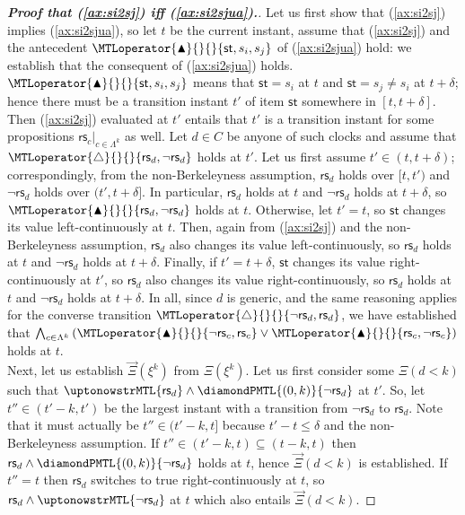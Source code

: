 \documentclass[a4paper]{article}
\newcommand{\frf}[1]{(\ref{#1})}
\newcommand{\st}{\mathsf{st}}
\newcommand{\rest}[1]{\mathsf{rs}_{#1}}
\newcommand{\becomesMTL}[1]{\MTLoperator{\triangle}{}{}{#1}}
\newcommand{\becomesOMTL}[1]{\MTLoperator{\blacktriangle}{}{}{#1}}
\newcommand{\becomesLMTL}[1]{\becomesOMTL{#1}}
\newcommand{\XiL}{\overrightarrow{\Xi}}
\theoremstyle{plain}
\theoremstyle{definition}
\begin{document}
\begin{proof}[\textbf{Proof that \frf{ax:si2sj} iff \frf{ax:si2sjua}.}]
Let us first show that \frf{ax:si2sj} implies \frf{ax:si2sjua}, so let $t$ be the current instant, assume that \frf{ax:si2sj} and the antecedent $\becomesLMTL{\st, s_i, s_j}$ of \frf{ax:si2sjua} hold: we establish that the consequent of \frf{ax:si2sjua} holds.
$\becomesLMTL{\st, s_i, s_j}$ means that $\st = s_i$ at $t$ and $\st = s_j \neq s_i$ at $t+\delta$; hence there must be a transition instant $t'$ of item $\st$ somewhere in $[t,t+\delta]$.
Then \frf{ax:si2sj} evaluated at $t'$ entails that $t'$ is a transition instant for some propositions $\rest{c}|_{c \in \Lambda^k}$ as well.
Let $d \in C$ be anyone of such clocks and assume that $\becomesMTL{\rest{d}, \neg \rest{d}}$ holds at $t'$.
Let us first assume $t' \in (t,t+\delta)$; correspondingly, from the non-Berkeleyness assumption, $\rest{d}$ holds over $[t,t')$ and $\neg \rest{d}$ holds over $(t', t+\delta]$.
In particular, $\rest{d}$ holds at $t$ and $\neg \rest{d}$ holds at $t+\delta$, so $\becomesLMTL{\rest{d}, \neg \rest{d}}$ holds at $t$.
Otherwise, let $t' = t$, so $\st$ changes its value left-continuously at $t$.
Then, again from \frf{ax:si2sj} and the non-Berkeleyness assumption, $\rest{d}$ also changes its value left-continuously, so $\rest{d}$ holds at $t$ and $\neg \rest{d}$ holds at $t+\delta$.
Finally, if $t' = t+\delta$, $\st$ changes its value right-continuously at $t'$, so $\rest{d}$ also changes its value right-continuously, so $\rest{d}$ holds at $t$ and $\neg \rest{d}$ holds at $t+\delta$.
In all, since $d$ is generic, and the same reasoning applies for the converse transition $\becomesMTL{\neg \rest{d}, \rest{d}}$, we have established that $\bigwedge_{c \in \Lambda^k} \left(\becomesLMTL{\neg \rest{c}, \rest{c}} \vee \becomesLMTL{\rest{c}, \neg \rest{c}}\right)$ holds at $t$. \\
Next, let us establish $\XiL(\xi^k)$ from $\Xi(\xi^k)$.
Let us first consider some $\Xi\left(d < k\right)$ such that $\uptonowstrMTL{\rest{d}} \wedge \diamondPMTL{(0, k)}{\neg \rest{d}}$ at $t'$.
So, let $t'' \in (t'-k, t')$ be the largest instant with a transition from $\neg \rest{d}$ to $\rest{d}$.
Note that it must actually be $t'' \in (t'-k, t]$ because $t'-t \leq \delta$ and the non-Berkeleyness assumption.
If $t'' \in (t'-k, t) \subseteq (t-k, t)$ then $\rest{d} \wedge \diamondPMTL{(0,k)}{\neg \rest{d}}$ holds at $t$, hence $\XiL\left(d < k\right)$ is established.
If $t'' = t$ then $\rest{d}$ switches to true right-continuously at $t$, so $\rest{d} \wedge \uptonowstrMTL{\neg \rest{d}}$ at $t$ which also entails $\XiL\left(d < k\right)$.

\end{proof}
\end{document}
